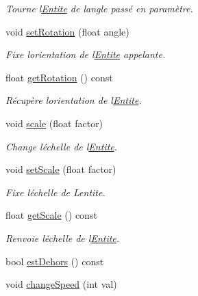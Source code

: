 \begin{DoxyCompactItemize}
\begin{DoxyCompactList}\small\item\em Tourne l\textquotesingle{}\hyperlink{class_entite}{Entite} de l\textquotesingle{}angle passé en paramètre. \end{DoxyCompactList}\item 
void \hyperlink{class_entite_a8623ac815e34b553098f45696ea8918b}{set\+Rotation} (float angle)
\begin{DoxyCompactList}\small\item\em Fixe l\textquotesingle{}orientation de l\textquotesingle{}\hyperlink{class_entite}{Entite} appelante. \end{DoxyCompactList}\item 
float \hyperlink{class_entite_a7f19439f7e7a5028f4b26eff21683de9}{get\+Rotation} () const
\begin{DoxyCompactList}\small\item\em Récupère l\textquotesingle{}orientation de l\textquotesingle{}\hyperlink{class_entite}{Entite}. \end{DoxyCompactList}\item 
void \hyperlink{class_entite_a770f6c53856606c4de768bb942299659}{scale} (float factor)
\begin{DoxyCompactList}\small\item\em Change l\textquotesingle{}échelle de l\textquotesingle{}\hyperlink{class_entite}{Entite}. \end{DoxyCompactList}\item 
void \hyperlink{class_entite_a665939253829baba965ce3ead0f1739c}{set\+Scale} (float factor)
\begin{DoxyCompactList}\small\item\em Fixe l\textquotesingle{}échelle de L\textquotesingle{}entite. \end{DoxyCompactList}\item 
float \hyperlink{class_entite_a5f70868f62049291edf4b245a531a6e0}{get\+Scale} () const
\begin{DoxyCompactList}\small\item\em Renvoie l\textquotesingle{}échelle de l\textquotesingle{}\hyperlink{class_entite}{Entite}. \end{DoxyCompactList}\item 
bool \hyperlink{class_entite_a8734ec47c87feb2b8b221bbf5d9ff2b4}{est\+Dehors} () const
\item 
void \hyperlink{class_entite_a88c148848289e34ca3bc991c37db9b44}{change\+Speed} (int val)
\end{DoxyCompactItemize}
